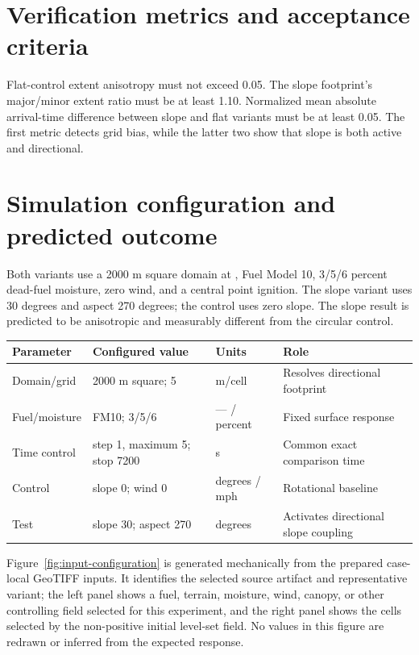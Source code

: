 \section{Verification metrics and acceptance criteria}

Flat-control extent anisotropy must not exceed 0.05. The slope footprint's major/minor extent ratio must be at least 1.10. Normalized mean absolute arrival-time difference between slope and flat variants must be at least 0.05. The first metric detects grid bias, while the latter two show that slope is both active and directional.

\section{Simulation configuration and predicted outcome}

Both variants use a 2000 m square domain at \CellSize{}, Fuel Model 10, 3/5/6 percent dead-fuel moisture, zero wind, and a central point ignition. The slope variant uses 30 degrees and aspect 270 degrees; the control uses zero slope. The slope result is predicted to be anisotropic and measurably different from the circular control.

\begin{center}\begin{tabular}{p{}p{}p{}p{}}\toprule
Parameter & Configured value & Units & Role \\
\midrule Domain/grid & 2000 m square; 5 & m/cell & Resolves directional footprint \\
Fuel/moisture & FM10; 3/5/6 & --- / percent & Fixed surface response \\
Time control & step 1, maximum 5; stop 7200 & s & Common exact comparison time \\
Control & slope 0; wind 0 & degrees / mph & Rotational baseline \\
Test & slope 30; aspect 270 & degrees & Activates directional slope coupling \\
\bottomrule\end{tabular}\end{center}

Figure~\ref{fig:input-configuration} is generated mechanically from the prepared case-local GeoTIFF inputs. It identifies the selected source artifact and representative variant; the left panel shows a fuel, terrain, moisture, wind, canopy, or other controlling field selected for this experiment, and the right panel shows the cells selected by the non-positive initial level-set field. No values in this figure are redrawn or inferred from the expected response.

